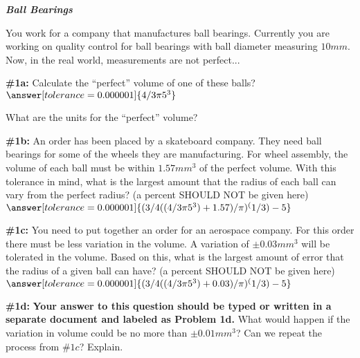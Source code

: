 \documentclass[handout,nooutcomes]{ximera}
\begin{document}
\begin{problem}{\textbf{\textit{Ball Bearings}}}

You work for a company that manufactures ball bearings. Currently you are working on quality control for ball bearings with ball diameter measuring $10mm$. Now, in the real world, measurements are not perfect...
    \begin{problem}{\textbf{\#1a:}}
    Calculate the ``perfect'' volume of one of these balls?
    $\answer[tolerance=0.000001]{4/3 \pi 5^3}$
    
    What are the units for the ``perfect'' volume?
    \begin{multipleChoice}
    \end{multipleChoice}
  
    \end{problem}
    \begin{problem}{\textbf{\#1b:}}
    An order has been placed by a skateboard company. They need ball bearings for some of the wheels they are manufacturing. For wheel assembly, the volume of each ball must be within $1.57mm^3$ of the perfect volume. With this tolerance in mind, what is the largest amount that the radius of each ball can vary from the perfect radius? (a percent SHOULD NOT be given here)
    $\answer[tolerance=0.000001]{(3/4((4/3 \pi 5^3)+1.57)/\pi)^(1/3)-5}$
    \end{problem}
    \begin{problem}{\textbf{\#1c:}}
    You need to put together an order for an aerospace company. For this order there must be less variation in the volume. A variation of $\pm0.03mm^3$ will be tolerated in the volume. Based on this, what is the largest amount of error that the radius of a given ball can have? (a percent SHOULD NOT be given here)
    $\answer[tolerance=0.000001]{(3/4((4/3 \pi 5^3)+0.03)/\pi)^(1/3)-5}$    
    \end{problem}
    
    
    \begin{problem}{\textbf{\#1d:}}
    \textbf{Your answer to this question should be typed or written in a separate document and labeled as Problem 1d.}
    What would happen if the variation in volume could be no more than $\pm0.01mm^3$? Can we repeat the process from $\# 1c$? Explain.
    \end{problem}
\end{problem}
\end{document}
